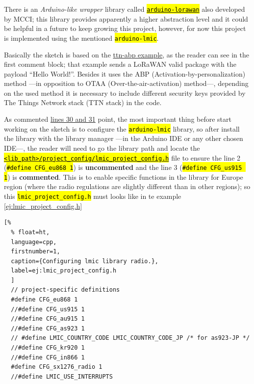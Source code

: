 \documentclass[11pt,a4paper,dvipsnames,twoside]{article}
\newcommand{\cmd}[1] {\hl{\texttt{#1}}}
\begin{document}
There is an \textit{Arduino-like wrapper} library called \href{https://github.com/mcci-catena/arduino-lorawan}{\cmd{arduino-lorawan}} also developed by MCCI; this library provides apparently a higher abstraction level and it could be helpful in a future to keep growing this project, however, for now this project is implemented using the mentioned \cmd{arduino-lmic}.

Basically the sketch is based on the \href{https://github.com/mcci-catena/arduino-lmic/blob/master/examples/ttn-abp/ttn-abp.ino}{ttn-abp example}, as the reader can see in the first comment block; that example sends a LoRaWAN valid package with the payload \enquote{Hello World!}. Besides it uses the ABP (Activation-by-personalization) method ---in opposition to OTAA (Over-the-air-activation) method---, depending on the used method it is necessary to include different security keys provided by The Things Network stack (TTN stack) in the code. \cite{TTN_Security}

As commented \href{https://github.com/mcci-catena/arduino-lmic/blob/master/examples/ttn-abp/ttn-abp.ino#L30}{lines 30 and 31} point, the most important thing before start working on the sketch is to configure the \cmd{arduino-lmic} library, so after install the library with the library manager ---in the Arduino IDE or any other chosen IDE---, the reader will need to go the library path and locate the \href{https://github.com/mcci-catena/arduino-lmic/blob/master/project_config/lmic_project_config.h}{\cmd{<lib\_path>/project\_config/lmic\_project\_config.h}} file to ensure the line 2 (\cmd{\#define CFG\_eu868 1}) is \textbf{uncommented} and the line 3 (\cmd{\#define CFG\_us915 1}) is \textbf{commented}. This is to enable specific functions in the library for Europe region (where the radio regulations are slightly different than in other regions); so this \cmd{lmic\_project\_config.h} must looks like in te example \ref{ej:lmic_project_config.h}

\begin{lstlisting}[%
  % float=ht,
  language=cpp,
  firstnumber=1,
  caption={Configuring lmic library radio.},
  label=ej:lmic_project_config.h
  ]
  // project-specific definitions
  #define CFG_eu868 1
  //#define CFG_us915 1
  //#define CFG_au915 1
  //#define CFG_as923 1
  // #define LMIC_COUNTRY_CODE LMIC_COUNTRY_CODE_JP	/* for as923-JP */
  //#define CFG_kr920 1
  //#define CFG_in866 1
  #define CFG_sx1276_radio 1
  //#define LMIC_USE_INTERRUPTS
\end{lstlisting}
\end{document}
